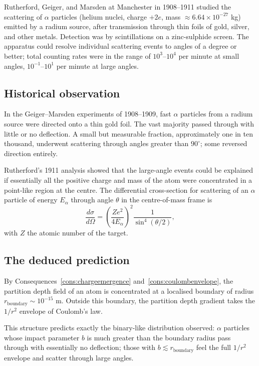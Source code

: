 Rutherford, Geiger, and Marsden at Manchester in 1908--1911 studied the
scattering of $\alpha$ particles (helium nuclei, charge $+2e$,
mass $\approx 6.64\times 10^{-27}$ kg) emitted by a radium source, after
transmission through thin foils of gold, silver, and other metals.
Detection was by scintillations on a zinc-sulphide screen.  The apparatus
could resolve individual scattering events to angles of a degree or better;
total counting rates were in the range of $10^{3}$--$10^{4}$ per minute at
small angles, $10^{-1}$--$10^{1}$ per minute at large angles.

\subsection{Historical observation}

In the Geiger--Marsden experiments of 1908--1909, fast $\alpha$ particles
from a radium source were directed onto a thin gold foil.  The vast majority
passed through with little or no deflection.  A small but measurable
fraction, approximately one in ten thousand, underwent scattering through
angles greater than $90^{\circ}$; some reversed direction entirely.

Rutherford's 1911 analysis showed that the large-angle events could be
explained if essentially all the positive charge and mass of the atom were
concentrated in a point-like region at the centre.  The differential
cross-section for scattering of an $\alpha$ particle of energy $E_{\alpha}$
through angle $\theta$ in the centre-of-mass frame is
\begin{equation}
  \frac{d\sigma}{d\Omega}=\left(\frac{Ze^{2}}{4E_{\alpha}}\right)^{2}
  \frac{1}{\sin^{4}(\theta/2)},
  \label{eq:rutherfordsigma-ch25}
\end{equation}
with $Z$ the atomic number of the target.

\subsection{The deduced prediction}

By Consequences~\ref{cons:chargeemergence} and~\ref{cons:coulombenvelope},
the partition depth field of an atom is concentrated at a localised boundary
of radius $r_{\text{boundary}}\sim 10^{-15}$ m.  Outside this boundary, the
partition depth gradient takes the $1/r^{2}$ envelope of Coulomb's law.

This structure predicts exactly the binary-like distribution observed:
$\alpha$ particles whose impact parameter $b$ is much greater than the
boundary radius pass through with essentially no deflection; those with
$b\lesssim r_{\text{boundary}}$ feel the full $1/r^{2}$ envelope and scatter
through large angles.

